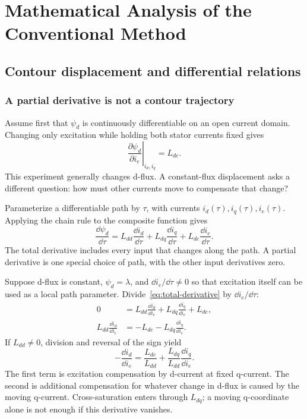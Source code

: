 \chapter{Mathematical Analysis of the Conventional Method}\label{ch:mathematics}

\section{Contour displacement and differential relations}
\subsection{A partial derivative is not a contour trajectory}
Assume first that $\psi_d$ is continuously differentiable on an open current domain. Changing only excitation while holding both stator currents fixed gives
\begin{equation}
\left.\frac{\partial\psi_d}{\partial i_e}\right|_{i_d,i_q}=L_{de}.
\end{equation}
This experiment generally changes d-flux. A constant-flux displacement asks a different question: how must other currents move to compensate that change?

Parameterize a differentiable path by $\tau$, with currents $i_d(\tau),i_q(\tau),i_e(\tau)$. Applying the chain rule to the composite function gives
\begin{equation}\label{eq:total-derivative}
\frac{\dd\psi_d}{\dd\tau}
=L_{dd}\frac{\dd i_d}{\dd\tau}
+L_{dq}\frac{\dd i_q}{\dd\tau}
+L_{de}\frac{\dd i_e}{\dd\tau}.
\end{equation}
The total derivative includes every input that changes along the path. A partial derivative is one special choice of path, with the other input derivatives zero.

Suppose d-flux is constant, $\psi_d=\lambda$, and $\dd i_e/\dd\tau\ne0$ so that excitation itself can be used as a local path parameter. Divide~\eqref{eq:total-derivative} by $\dd i_e/\dd\tau$:
\begin{align}
0&=L_{dd}\frac{\dd i_d}{\dd i_e}
+L_{dq}\frac{\dd i_q}{\dd i_e}+L_{de},\\
L_{dd}\frac{\dd i_d}{\dd i_e}
&=-L_{de}-L_{dq}\frac{\dd i_q}{\dd i_e}.
\end{align}
If $L_{dd}\ne0$, division and reversal of the sign yield
\begin{equation}\label{eq:contour-total-slope}
\boxed{-\frac{\dd i_d}{\dd i_e}
=\frac{L_{de}}{L_{dd}}
+\frac{L_{dq}}{L_{dd}}\frac{\dd i_q}{\dd i_e}.}
\end{equation}
The first term is excitation compensation by d-current at fixed q-current. The second is additional compensation for whatever change in d-flux is caused by the moving q-current. Cross-saturation enters through $L_{dq}$; a moving q-coordinate alone is not enough if this derivative vanishes.

